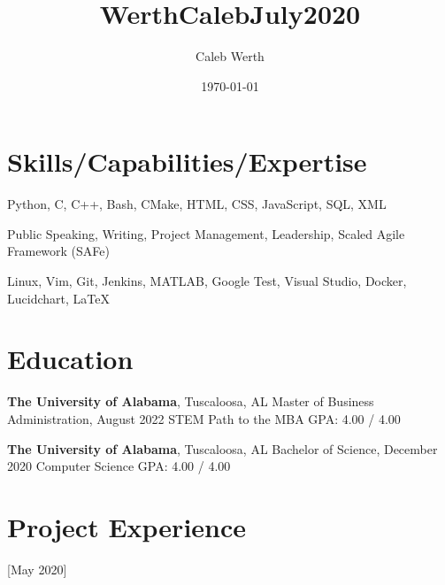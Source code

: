 \documentclass[hidelinks, 11pt]{article}
\title{WerthCalebJuly2020}
\author{Caleb Werth}
\date{\today}
\begin{document}
\makecvtitle
\vspace{1.0mm}

\section{Skills/Capabilities/Expertise}

\begin{description}[widest=Programming Langauges:]
  \item[Programming Languages:]	Python, C, C++, Bash, CMake, HTML, CSS, JavaScript, SQL, XML
  \item[Soft Skills:]	Public Speaking, Writing, Project Management, Leadership, Scaled Agile Framework (SAFe)
  \item[Tools:]	Linux, Vim, Git, Jenkins, MATLAB, Google Test, Visual Studio, Docker, Lucidchart, LaTeX
\end{description}\leavevmode

\section{Education}
\vspace{-2.0mm}
\begin{multicols}{2}

  \begin{minipage}{0.5\textwidth}
    \textbf{The University of Alabama}, Tuscaloosa, AL \newline
    Master of Business Administration, August 2022 \newline
    STEM Path to the MBA \newline
    GPA: 4.00 / 4.00
  \end{minipage}

  \begin{minipage}{0.5\textwidth}
    \textbf{The University of Alabama}, Tuscaloosa, AL \newline
    Bachelor of Science, December 2020 \newline
    Computer Science \newline
    GPA: 4.00 / 4.00
  \end{minipage}

\end{multicols}

\section{Project Experience}

[May 2020]
\end{document}
